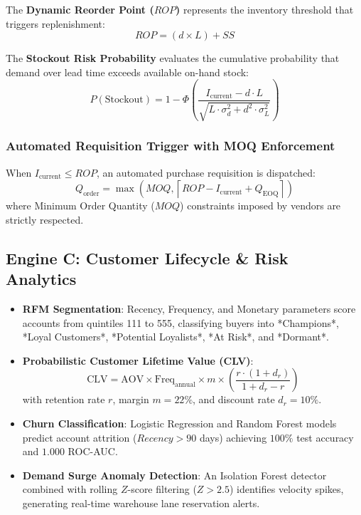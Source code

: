 \documentclass[11pt,a4paper]{article}
\begin{document}
The \textbf{Dynamic Reorder Point ($ROP$)} represents the inventory threshold that triggers replenishment:
\begin{equation}
    ROP = (d \times L) + SS
\end{equation}

The \textbf{Stockout Risk Probability} evaluates the cumulative probability that demand over lead time exceeds available on-hand stock:
\begin{equation}
    P(\text{Stockout}) = 1 - \Phi\left(\frac{I_{\text{current}} - d \cdot L}{\sqrt{L \cdot \sigma_d^2 + d^2 \cdot \sigma_L^2}}\right)
\end{equation}

\subsubsection{Automated Requisition Trigger with MOQ Enforcement}
When $I_{\text{current}} \le ROP$, an automated purchase requisition is dispatched:
\begin{equation}
    Q_{\text{order}} = \max\left( MOQ, \left\lceil ROP - I_{\text{current}} + Q_{\text{EOQ}} \right\rceil \right)
\end{equation}
where Minimum Order Quantity ($MOQ$) constraints imposed by vendors are strictly respected.

\subsection{Engine C: Customer Lifecycle \& Risk Analytics}
\begin{itemize}[leftmargin=1.5em, itemsep=3pt]
    \item \textbf{RFM Segmentation}: Recency, Frequency, and Monetary parameters score accounts from quintiles 111 to 555, classifying buyers into *Champions*, *Loyal Customers*, *Potential Loyalists*, *At Risk*, and *Dormant*.
    \item \textbf{Probabilistic Customer Lifetime Value (CLV)}:
    \begin{equation}
        \text{CLV} = \text{AOV} \times \text{Freq}_{\text{annual}} \times m \times \left( \frac{r \cdot (1 + d_r)}{1 + d_r - r} \right)
    \end{equation}
    with retention rate $r$, margin $m = 22\%$, and discount rate $d_r = 10\%$.
    \item \textbf{Churn Classification}: Logistic Regression and Random Forest models predict account attrition ($Recency > 90$ days) achieving $100\%$ test accuracy and $1.000$ ROC-AUC.
    \item \textbf{Demand Surge Anomaly Detection}: An Isolation Forest detector combined with rolling $Z$-score filtering ($Z > 2.5$) identifies velocity spikes, generating real-time warehouse lane reservation alerts.
\end{itemize}
\end{document}
